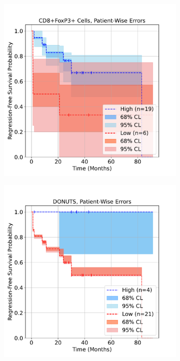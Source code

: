\documentclass[article]{jss}
\begin{document}
\begin{figure}[p]
\begin{subfigure}[t]{\figwidth}
    \caption{\label{fig:lung-dataset-donuts}}
  \end{subfigure} \\
  \vspace{\spacebetweenrows}
  \begin{subfigure}[t]{\figwidth}
    \centering
    \includegraphics[width=\linewidth]{lung_cells_km_RFS_patient_wise.pdf}
    \caption{\label{fig:lung-dataset-cells-patient-wise}}
  \end{subfigure}
  \begin{subfigure}[t]{\figwidth}
    \centering
    \includegraphics[width=\linewidth]{lung_donuts_km_RFS_patient_wise.pdf}

\end{subfigure}
\end{figure}
\end{document}
